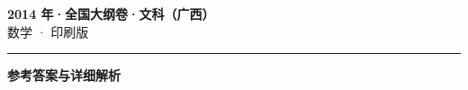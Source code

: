 \documentclass[zihao=5, a4paper]{ctexart}
\begin{document}
\begin{center}
  {\Large\bfseries 2014 年·全国大纲卷·文科（广西）}\\[4pt]
  {\large 数学 · 印刷版}
\end{center}
\medskip
{}

\par\bigskip\hrule\bigskip
{}
\Needspace{0.55\textheight}
\begin{center}{\large\bfseries 参考答案与详细解析}\end{center}
\smallskip

\end{document}
